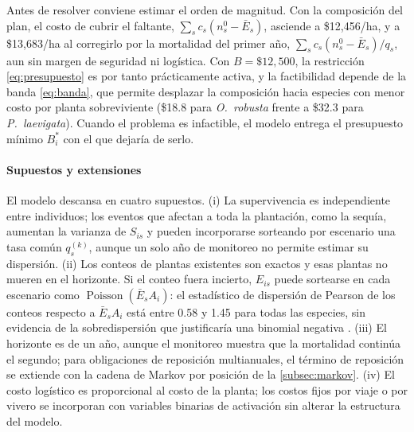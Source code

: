 Antes de resolver conviene estimar el orden de magnitud. Con la composición del plan, el costo de cubrir el faltante, $\sum_sc_s(n_s^0-\bar{E}_s)$, asciende a \$12{,}456/ha, y a \$13{,}683/ha al corregirlo por la mortalidad del primer año, $\sum_sc_s(n_s^0-\bar{E}_s)/q_s$, aun sin margen de seguridad ni logística. Con $B=\$12{,}500$, la restricción \eqref{eq:presupuesto} es por tanto prácticamente activa, y la factibilidad depende de la banda \eqref{eq:banda}, que permite desplazar la composición hacia especies con menor costo por planta sobreviviente (\$18.8 para \textit{O.~robusta} frente a \$32.3 para \textit{P.~laevigata}). Cuando el problema es infactible, el modelo entrega el presupuesto mínimo $B_i^{*}$ con el que dejaría de serlo.

\paragraph{Supuestos y extensiones}
\label{subsec:compra-supuestos}

El modelo descansa en cuatro supuestos. (i) La supervivencia es independiente entre individuos; los eventos que afectan a toda la plantación, como la sequía, aumentan la varianza de $S_{is}$ y pueden incorporarse sorteando por escenario una tasa común $q_s^{(k)}$, aunque un solo año de monitoreo no permite estimar su dispersión. (ii) Los conteos de plantas existentes son exactos y esas plantas no mueren en el horizonte. Si el conteo fuera incierto, $E_{is}$ puede sortearse en cada escenario como $\operatorname{Poisson}(\bar{E}_sA_i)$: el estadístico de dispersión de Pearson de los conteos respecto a $\bar{E}_sA_i$ está entre 0.58 y 1.45 para todas las especies, sin evidencia de la sobredispersión que justificaría una binomial negativa \autocite{cameron2013}. (iii) El horizonte es de un año, aunque el monitoreo muestra que la mortalidad continúa el segundo; para obligaciones de reposición multianuales, el término de reposición se extiende con la cadena de Markov por posición de la \cref{subsec:markov}. (iv) El costo logístico es proporcional al costo de la planta; los costos fijos por viaje o por vivero se incorporan con variables binarias de activación sin alterar la estructura del modelo.

